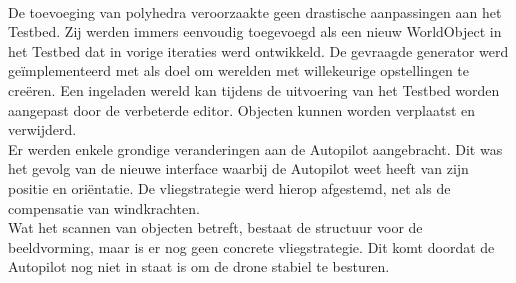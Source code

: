 \\

\noindent
De toevoeging van polyhedra veroorzaakte geen drastische aanpassingen aan het Testbed. Zij werden immers eenvoudig toegevoegd als een nieuw WorldObject in het Testbed dat in vorige iteraties werd ontwikkeld. De gevraagde generator werd ge\"implementeerd met als doel om werelden met willekeurige opstellingen te cre\"eren. Een ingeladen wereld kan tijdens de uitvoering van het Testbed worden aangepast door de verbeterde editor. Objecten kunnen worden verplaatst en verwijderd.
~\\
Er werden enkele grondige veranderingen aan de Autopilot aangebracht. Dit was het gevolg van de nieuwe interface waarbij de Autopilot weet heeft van zijn positie en ori\"entatie. De vliegstrategie werd  hierop afgestemd, net als de compensatie van windkrachten. \\
Wat het scannen van objecten betreft, bestaat de structuur voor de beeldvorming, maar is er nog geen concrete vliegstrategie. Dit komt doordat de Autopilot nog niet in staat is om de drone stabiel te besturen.
